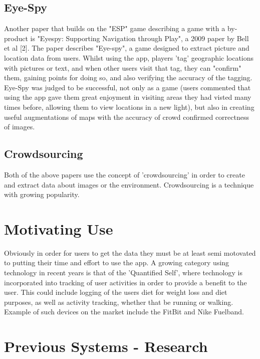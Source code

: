 \documentclass{l4proj}
\begin{document}
\subsection{Eye-Spy}

Another paper that builds on the "ESP" game describing a game with a by-product is "Eyespy: Supporting Navigation through Play", a 2009 paper by Bell et al [2]. The paper describes "Eye-spy", a game designed to extract picture and location data from users. Whilst using the app, players 'tag' geographic locations with pictures or text, and when other users visit that tag, they can "confirm" them, gaining points for doing so, and also verifying the accuracy of the tagging. Eye-Spy was judged to be successful, not only as a game (users commented that using the app gave them great enjoyment in visiting areas they had visted many times before, allowing them to view locations in a new light), but also in creating useful augmentations of maps with the accuracy of crowd confirmed correctness of images.

\subsection{Crowdsourcing}

Both of the above papers use the concept of 'crowdsourcing' in order to create and extract data about images or the environment. Crowdsourcing is a technique with growing popularity.

\subsection{}

\section{Motivating Use}

Obviously in order for users to get the data they must be at least semi motovated to putting their time and effort to use the app. A growing category using technology in recent years is that of the 'Quantified Self', where technology is incorporated into tracking of user activities in order to provide a benefit to the user. This could include logging of the users diet for weight loss and diet purposes, as well as activity tracking, whether that be running or walking. Example of such devices on the market include the FitBit and Nike Fuelband.

\section{Previous Systems - Research}
\end{document}
